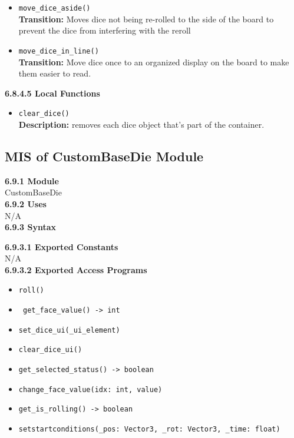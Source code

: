 \documentclass[12pt, titlepage]{article}
\begin{document}
\begin{itemize}
	\item \texttt{move\_dice\_aside() }\\
	\textbf{Transition:} Moves dice not being re-rolled to the side of the board to prevent the dice from interfering with the reroll
	
	\item \texttt{move\_dice\_in\_line() }\\
	\textbf{Transition:} Move dice once to an organized display on the board to make them easier to read. 

	


\end{itemize}

\textbf{6.8.4.5 Local Functions}

\begin{itemize}
	
	\item \texttt{clear\_dice() }\\
	\textbf{Description:} removes each dice object that's part of the container. 
	
\end{itemize}


\subsection{MIS of CustomBaseDie Module}\label{CustomBaseDie}
\textbf{6.9.1 Module}\\
 CustomBaseDie\\

\noindent \textbf{6.9.2 Uses}\\
N/A \\

\noindent \textbf{6.9.3 Syntax}

\noindent \textbf{6.9.3.1 Exported Constants}\\
N/A\\

\textbf{6.9.3.2 Exported Access Programs}
\begin{itemize}
	\item \texttt{roll() }
	\item \texttt{ get\_face\_value() -> int }
	\item \texttt{set\_dice\_ui(\_ui\_element) }
	\item \texttt{clear\_dice\_ui() }
	\item \texttt{get\_selected\_status() -> boolean}
	\item \texttt{change\_face\_value(idx: int, value) }
	\item \texttt{get\_is\_rolling() -> boolean }
	\item \texttt{setstartconditions(\_pos: Vector3, \_rot: Vector3, \_time: float) }
	
	
\end{itemize}
\end{document}
